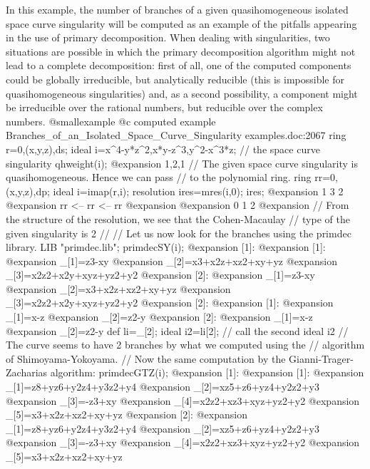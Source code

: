 In this example, the number of branches of a given quasihomogeneous isolated
space curve singularity will be computed as an example of the pitfalls
appearing in the use of primary decomposition. When dealing with singularities,
two situations are possible in which the primary decomposition algorithm
might not lead to a complete decomposition: first of all, one of the computed
components could be globally irreducible, but analytically reducible
(this is impossible for quasihomogeneous singularities) and,
as a second possibility, a component might be irreducible over the rational
numbers, but reducible over the complex numbers.
@smallexample
@c computed example Branches_of_an_Isolated_Space_Curve_Singularity examples.doc:2067 
  ring r=0,(x,y,z),ds;
  ideal i=x^4-y*z^2,x*y-z^3,y^2-x^3*z;  // the space curve singularity
  qhweight(i);
@expansion{} 1,2,1
  // The given space curve singularity is quasihomogeneous. Hence we can pass
  // to the polynomial ring.
  ring rr=0,(x,y,z),dp;
  ideal i=imap(r,i);
  resolution ires=mres(i,0);
  ires;
@expansion{}   1       3       2       
@expansion{} rr <--  rr <--  rr
@expansion{} 
@expansion{} 0       1       2       
@expansion{} 
  // From the structure of the resolution, we see that the Cohen-Macaulay
  // type of the given singularity is 2
  //
  // Let us now look for the branches using the primdec library.
  LIB "primdec.lib";
  primdecSY(i);
@expansion{} [1]:
@expansion{}    [1]:
@expansion{}       _[1]=z3-xy
@expansion{}       _[2]=x3+x2z+xz2+xy+yz
@expansion{}       _[3]=x2z2+x2y+xyz+yz2+y2
@expansion{}    [2]:
@expansion{}       _[1]=z3-xy
@expansion{}       _[2]=x3+x2z+xz2+xy+yz
@expansion{}       _[3]=x2z2+x2y+xyz+yz2+y2
@expansion{} [2]:
@expansion{}    [1]:
@expansion{}       _[1]=x-z
@expansion{}       _[2]=z2-y
@expansion{}    [2]:
@expansion{}       _[1]=x-z
@expansion{}       _[2]=z2-y
  def li=_[2];
  ideal i2=li[2];       // call the second ideal i2
  // The curve seems to have 2 branches by what we computed using the
  // algorithm of Shimoyama-Yokoyama.
  // Now the same computation by the Gianni-Trager-Zacharias algorithm:
  primdecGTZ(i);
@expansion{} [1]:
@expansion{}    [1]:
@expansion{}       _[1]=z8+yz6+y2z4+y3z2+y4
@expansion{}       _[2]=xz5+z6+yz4+y2z2+y3
@expansion{}       _[3]=-z3+xy
@expansion{}       _[4]=x2z2+xz3+xyz+yz2+y2
@expansion{}       _[5]=x3+x2z+xz2+xy+yz
@expansion{}    [2]:
@expansion{}       _[1]=z8+yz6+y2z4+y3z2+y4
@expansion{}       _[2]=xz5+z6+yz4+y2z2+y3
@expansion{}       _[3]=-z3+xy
@expansion{}       _[4]=x2z2+xz3+xyz+yz2+y2
@expansion{}       _[5]=x3+x2z+xz2+xy+yz
